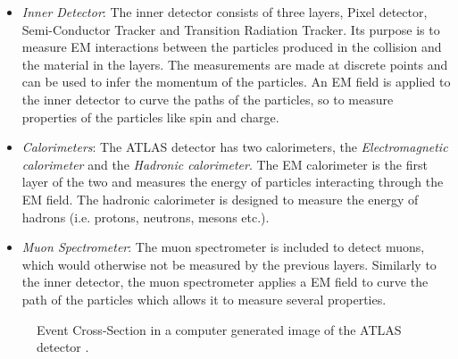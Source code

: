 \begin{itemize}
    \item \emph{Inner Detector}: The inner detector consists of three layers, Pixel detector, Semi-Conductor Tracker 
          and Transition Radiation Tracker. Its purpose is to measure \ac{EM} interactions between the particles 
          produced in the collision and the material in the layers. The measurements are made at discrete points and can be 
          used to infer the momentum of the particles. An \ac{EM} field is applied to the inner detector
          to curve the paths of the particles, so to measure properties of the particles like spin and charge.  
    \item \emph{Calorimeters}: The \ac{ATLAS} detector has two calorimeters, the \emph{Electromagnetic calorimeter} and the 
           \emph{Hadronic calorimeter}. The \ac{EM} calorimeter is the first layer of the two and measures the energy of 
           particles interacting through the \ac{EM} field. The hadronic calorimeter is designed to measure the energy of 
           hadrons (i.e. protons, neutrons, mesons etc.).
    \item \emph{Muon Spectrometer}: The muon spectrometer is included to detect muons, which would otherwise not be measured 
           by the previous layers. Similarly to the inner detector, the muon spectrometer applies a \ac{EM} field to 
           curve the path of the particles which allows it to measure several properties. 
\end{itemize}
\begin{figure}
    \centering
    \caption[Event Cross Section in a computer generated image of the
    ATLAS detector.]{Event Cross-Section in a computer generated image of the
    ATLAS detector \cite{PDetector}.}
    \label{fig:detector}
\end{figure}

